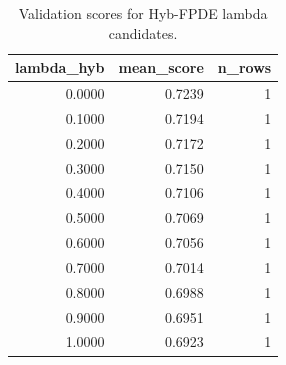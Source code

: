 \begin{table}[t]
\caption{Validation scores for Hyb-FPDE lambda candidates.}
\label{tab:lambda_distribution_computed}
\centering
\begin{tabular}{rrr}
\toprule
lambda\_hyb & mean\_score & n\_rows \\
\midrule
0.0000 & 0.7239 & 1 \\
0.1000 & 0.7194 & 1 \\
0.2000 & 0.7172 & 1 \\
0.3000 & 0.7150 & 1 \\
0.4000 & 0.7106 & 1 \\
0.5000 & 0.7069 & 1 \\
0.6000 & 0.7056 & 1 \\
0.7000 & 0.7014 & 1 \\
0.8000 & 0.6988 & 1 \\
0.9000 & 0.6951 & 1 \\
1.0000 & 0.6923 & 1 \\
\bottomrule
\end{tabular}

\end{table}
